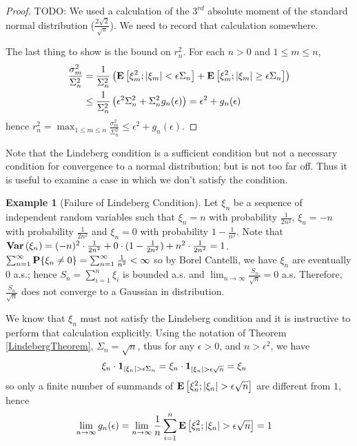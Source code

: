 \documentclass{amsart}
\theoremstyle{remark}
\theoremstyle{definition}
\newtheorem{examp}[thm]{Example}
\begin{document}
\begin{proof}
TODO: We used a calculation of the $3^{rd}$ absolute moment of the
standard normal distribution ($\frac{2\sqrt{2}}{\sqrt{\pi}}$).  We need to record that calculation somewhere.

The last thing to show is the bound on $r_n^2$.  For each $n >0$ and
$1 \leq m \leq n$,
\begin{align*}
\frac{\sigma_m^2}{\Sigma_n^2} &= \frac{1}{\Sigma_n^2} \left(
  \textbf{E}\left[\xi_m^2 ; \left \vert \xi_m \right \vert < \epsilon \Sigma_n\right] +
  \textbf{E}\left[\xi_m^2 ; \left \vert \xi_m \right \vert \geq \epsilon \Sigma_n\right] \right) \\
&\leq \frac{1}{\Sigma_n^2} \left(\epsilon^2 \Sigma_n^2 + \Sigma_n^2
  g_n(\epsilon) \right) = \epsilon^2 + g_n(\epsilon)
\end{align*}
hence $r_n^2 = \max_{1\leq m \leq n} \frac{\sigma_m^2}{\Sigma_n^2}
\leq \epsilon^2 + g_n(\epsilon)$.
\end{proof}

Note that the Lindeberg condition is a sufficient condition but not a
necessary condition for convergence to a normal distribution; but is
not too far off.  Thus it is useful to examine a case in which we
don't satisfy the condition.
\begin{examp}[Failure of Lindeberg Condition]Let $\xi_n$ be a sequence
  of independent random
  variables such that $\xi_n = n$ with probability $\frac{1}{2n^2}$, $\xi_n =
  -n$ with probability $\frac{1}{2n^2}$ and $\xi_n = 0$ with
  probability $1-\frac{1}{n^2}$.  Note that $\textbf{Var} \left (\xi_n \right ) =
  (-n)^2 \cdot \frac{1}{2n^2} + 0 \cdot (1 - \frac{1}{2n^2}) +  n^2 \cdot
  \frac{1}{2n^2} = 1$.  
$\sum_{n=1}^\infty
  \textbf{P}\{\xi_n \neq 0\} = \sum_{n=1}^\infty \frac{1}{n^2} <
  \infty$ so by Borel Cantelli, we have $\xi_n$ are eventually $0$
  a.s.; hence $S_n = \sum_{i=1}^n \xi_i$ is bounded a.s. and $\lim_{n
    \to \infty} \frac{S_n}{\sqrt{n}} = 0$ a.s.  Therefore,
  $\frac{S_n}{\sqrt{n}}$ does not converge to a Gaussian in
  distribution.

We know that $\xi_n$ must not satisfy the Lindeberg condition and it
is instructive to perform that calculation explicitly.  Using the
notation of Theorem \ref{LindebergTheorem}, $\Sigma_n = \sqrt{n}$,
thus for any $\epsilon >
0$, and $n > \epsilon^2$, we have 
\begin{align*}
\xi_n \cdot \textbf{1}_{\left \vert \xi_n \right \vert >
  \epsilon \Sigma_n} &= \xi_n \cdot \textbf{1}_{\left \vert \xi_n \right \vert >
  \epsilon \sqrt{n}} = \xi_n
\end{align*}
so only a finite number of summands of $\textbf{E}\left[ \xi_n^2 ;
  \left \vert \xi_n \right \vert >  \epsilon \sqrt{n}\right]$ are different from $1$, hence
\begin{align*}
\lim_{n \to \infty} g_n(\epsilon) &=\lim_{n \to \infty} \frac{1}{n} \sum_{i=1}^n \textbf{E}\left[ \xi_n^2 ;
  \left \vert \xi_n \right \vert >  \epsilon \sqrt{n}\right] = 1
\end{align*}
\end{examp}
\end{document}
